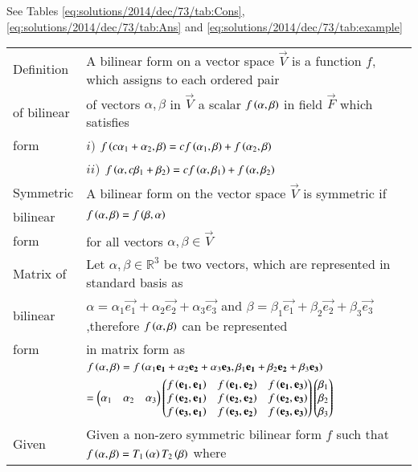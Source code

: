 See Tables     \ref{eq:solutions/2014/dec/73/tab:Cons},     \ref{eq:solutions/2014/dec/73/tab:Ans}
and     \ref{eq:solutions/2014/dec/73/tab:example}


\onecolumn
\begin{longtable}{|l|l|}
    \hline
    Definition&A bilinear form on a vector space $\vec{V}$ is a function $f$, which assigns to each ordered pair\\
    of bilinear&of vectors $\alpha,\beta$ in $\vec{V}$ a scalar $f\left(\alpha,\beta\right)$ in field $\vec{F}$ which satisfies\\
    form&\qquad \qquad $i)$ $f\left(c\alpha_1+\alpha_2,\beta\right)=cf\left(\alpha_1,\beta\right)+f\left(\alpha_2,\beta\right)$\\
    &\qquad \qquad $ii)$ $f\left(\alpha,c\beta_1+\beta_2\right)=cf\left(\alpha,\beta_1\right)+f\left(\alpha,\beta_2\right)$\\
    \hline
    Symmetric&A bilinear form on the vector space $\vec{V}$ is symmetric if\\
    bilinear&\qquad \qquad \qquad $f\left(\alpha,\beta\right)=f\left(\beta,\alpha\right)$\\
    form& for all vectors $\alpha,\beta\in\vec{V}$\\
    \hline
    Matrix of &Let $\alpha,\beta\in\mathbb{R}^3$ be two vectors, which are represented in standard basis as\\
    bilinear&$\alpha=\alpha_1\vec{e_1}+\alpha_2\vec{e_2}+\alpha_3\vec{e_3}$ and $\beta=\beta_1\vec{e_1}+\beta_2\vec{e_2}+\beta_3\vec{e_3}$,therefore $f\left(\alpha,\beta\right)$ can be represented \\
    form&in matrix form as\\
    &$f\left(\alpha,\beta\right)=f\left(\alpha_1\mathbf{e_1}+\alpha_2\mathbf{e_2}+\alpha_3\mathbf{e_3},\beta_1\mathbf{e_1}+\beta_2\mathbf{e_2}+\beta_3\mathbf{e_3}\right)$\\
    &$=\begin{pmatrix}\alpha_1&\alpha_2&\alpha_3\end{pmatrix}\begin{pmatrix}f\left(\mathbf{e_1},\mathbf{e_1}\right)&f\left(\mathbf{e_1},\mathbf{e_2}\right)&f\left(\mathbf{e_1},\mathbf{e_3}\right)\\f\left(\mathbf{e_2},\mathbf{e_1}\right)&f\left(\mathbf{e_2},\mathbf{e_2}\right)&f\left(\mathbf{e_2},\mathbf{e_3}\right)\\f\left(\mathbf{e_3},\mathbf{e_1}\right)&f\left(\mathbf{e_3},\mathbf{e_2}\right)&f\left(\mathbf{e_3},\mathbf{e_3}\right)\end{pmatrix}\begin{pmatrix}\beta_1\\\beta_2\\\beta_3\end{pmatrix}$\\
    \hline
    Given &Given a non-zero symmetric bilinear form $f$ such that $f\left(\alpha,\beta\right)=T_1\left(\alpha\right)T_2\left(\beta\right)$ where\\

\end{longtable}
